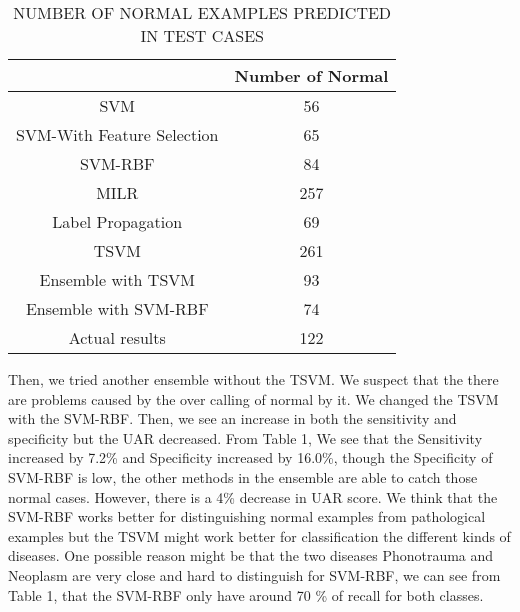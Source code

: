 \begin{table*}[!htbp]
	\caption{NUMBER OF NORMAL EXAMPLES PREDICTED IN TEST CASES}
	\begin{center}
		\begin{tabular}{|c|c|}
			\hline
			& Number of Normal \\
			\hline
			SVM & 56\\
			\hline
			SVM-With Feature Selection & 65\\
			\hline
			SVM-RBF & 84 \\
			\hline
			MILR & 257 \\
			\hline
			Label Propagation & 69 \\
			\hline
			TSVM & 261 \\
			\hline
			Ensemble with TSVM & 93\\
			\hline
			Ensemble with SVM-RBF & 74\\
			\hline
			Actual results& 122 \\
			\hline
		\end{tabular}
		\label{tab2}
	\end{center}
\end{table*}

Then, we tried another ensemble without the TSVM. We suspect that the there are problems caused by the over calling of normal by it. We changed the TSVM with the SVM-RBF. Then, we see an increase in both the sensitivity and specificity but the UAR decreased. From Table 1, We see that the Sensitivity increased by 7.2\% and Specificity increased by 16.0\%, though the Specificity of SVM-RBF is low, the other methods in the ensemble are able to catch those normal cases. However, there is a 4\% decrease in UAR score. We think that the SVM-RBF works better for distinguishing normal examples from pathological examples but the TSVM might work better for classification the different kinds of diseases. One possible reason might be that the two diseases Phonotrauma and Neoplasm are very close and hard to distinguish for SVM-RBF, we can see from Table 1, that the SVM-RBF only have around 70 \% of recall for both classes.
 
